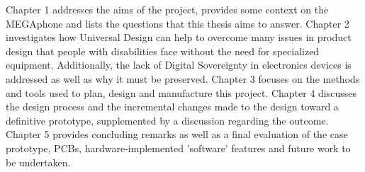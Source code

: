 Chapter 1 addresses the aims of the project, provides some context on the MEGAphone and lists the questions that this thesis aims to answer.
Chapter 2 investigates how Universal Design can help to overcome many issues in product design that people with disabilities face without the need for specialized equipment. 
Additionally, the lack of Digital Sovereignty in electronics devices is addressed as well as why it must be preserved.
Chapter 3 focuses on the methods and tools used to plan, design and manufacture this project.
Chapter 4 discusses the design process and the incremental changes made to the design toward a definitive prototype, supplemented by a discussion regarding the outcome.
Chapter 5 provides concluding remarks as well as a final evaluation of the case prototype, PCBs, hardware-implemented 'software' features and future work to be undertaken.
